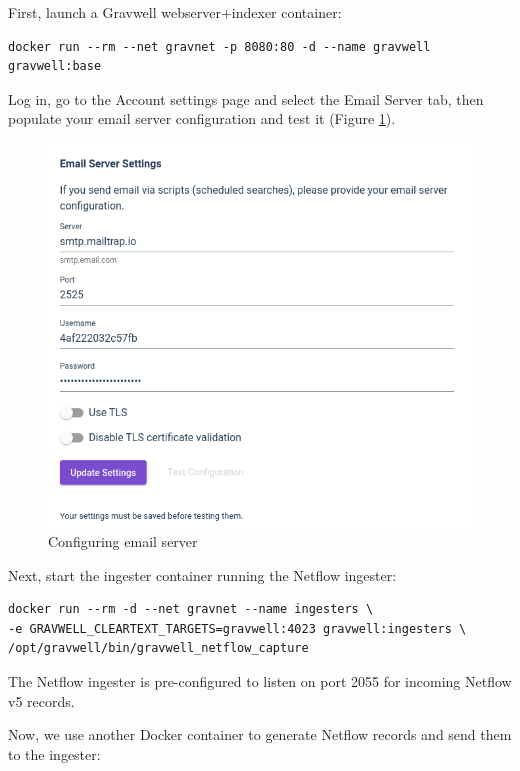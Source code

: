 First, launch a Gravwell webserver+indexer container:

\begin{Verbatim}[breaklines=true]
docker run --rm --net gravnet -p 8080:80 -d --name gravwell gravwell:base
\end{Verbatim}

Log in, go to the Account
settings page and select the Email Server tab, then populate your email
server configuration and test it (Figure \ref{fig:lab-emailsettings}).

\begin{figure}
	\includegraphics{images/lab-emailsettings.png}
	\caption{Configuring email server}
	\label{fig:lab-emailsettings}
\end{figure}

Next, start the ingester container running the Netflow ingester:

\begin{Verbatim}[breaklines=true]
docker run --rm -d --net gravnet --name ingesters \
-e GRAVWELL_CLEARTEXT_TARGETS=gravwell:4023 gravwell:ingesters \
/opt/gravwell/bin/gravwell_netflow_capture
\end{Verbatim}

The Netflow ingester is pre-configured to listen on port 2055 for
incoming Netflow v5 records.

Now, we use another Docker container to generate Netflow records and
send them to the ingester:

